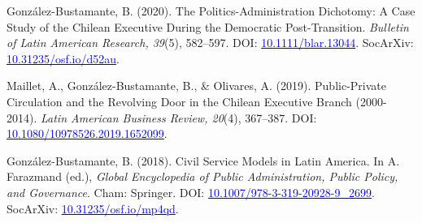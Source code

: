 \begin{publications}
\begin{benumerate}{8}
\item{González-Bustamante, B. (2020). The Politics-Administration Dichotomy: A Case Study of the Chilean Executive During the Democratic Post-Transition. {\itshape Bulletin of Latin American Research, 39}(5), 582--597. DOI: \href{https://doi.org/10.1111/blar.13044}{\textcolor{blue}{10.1111/blar.13044}}. SocArXiv: \href{https://doi.org/10.31235/osf.io/d52au}{\textcolor{blue}{10.31235/osf.io/d52au}}.}\vspace{1mm}


\item{Maillet, A., González-Bustamante, B., \& Olivares, A. (2019). Public-Private Circulation and the Revolving Door in the Chilean Executive Branch (2000-2014). {\itshape Latin American Business Review, 20}(4), 367--387. DOI: \href{https://doi.org/10.1080/10978526.2019.1652099}{\textcolor{blue}{10.1080/10978526.2019.1652099}}.}\vspace{1mm}


\item{González-Bustamante, B. (2018). Civil Service Models in Latin America. In A. Farazmand (ed.), {\itshape Global Encyclopedia of Public Administration, Public Policy, and Governance}. Cham: Springer. DOI: \href{https://doi.org/10.1007/978-3-319-20928-9\_2699}{\textcolor{blue}{10.1007/978-3-319-20928-9\_2699}}. SocArXiv: \href{https://doi.org/10.31235/osf.io/mp4qd}{\textcolor{blue}{10.31235/osf.io/mp4qd}}.}\vspace{1mm}


\end{benumerate}
\end{publications}
